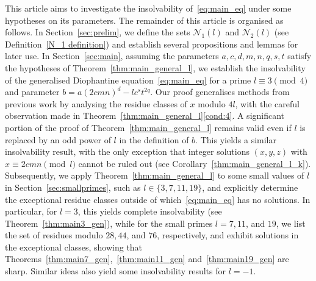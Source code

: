 \documentclass[11pt,a4paper]{amsart}
\theoremstyle{plain}
\theoremstyle{definition}
\begin{document}
This article aims to investigate the insolvability of~\eqref{eq:main_eq} under some hypotheses on its parameters. The remainder of this article is organised as follows. In Section~\ref{sec:prelim}, we define the sets $\mathcal{N}_1(l)$ and $\mathcal{N}_2(l)$ (see Definition~\ref{N_1 definition}) and establish several propositions and lemmas for later use. In Section~\ref{sec:main}, assuming the parameters $a,c,d,m,n,q,s,t$ satisfy the hypotheses of Theorem~\ref{thm:main_general_l}, we establish the insolvability of the generalised Diophantine equation~\eqref{eq:main_eq} for a prime $l \equiv 3 \pmod{4}$ and parameter $b = a (2 c m n)^{d} - l c^{s} t^{2q}$. Our proof generalises methods from previous work by analysing the residue classes of $x$ modulo $4l$, with the careful observation made in Theorem~\ref{thm:main_general_l}\ref{cond:4}. A significant portion of the proof of Theorem~\ref{thm:main_general_l} remains valid even if $l$ is replaced by an odd power of $l$ in the definition of $b$. This yields a similar insolvability result, with the only exception that integer solutions $(x,y,z)$ with $x \equiv 2cmn \pmod l$ cannot be ruled out (see Corollary~\ref{thm:main_general_l_k}). Subsequently, we apply Theorem~\ref{thm:main_general_l} to some small values of $l$ in Section~\ref{sec:smallprimes}, such as $l \in \{ 3, 7, 11, 19\}$, and explicitly determine the exceptional residue classes outside of which~\eqref{eq:main_eq} has no solutions. In particular, for $l = 3$, this yields complete insolvability (see Theorem~\ref{thm:main3_gen}), while for the small primes $l = 7, 11$, and $ 19$, we list the set of residues modulo $28, 44$, and $76$, respectively, and exhibit solutions in the exceptional classes, showing that Theorems~\ref{thm:main7_gen},~\ref{thm:main11_gen} and~\ref{thm:main19_gen} are sharp. Similar ideas also yield some insolvability results for $l=-1$.
\end{document}
